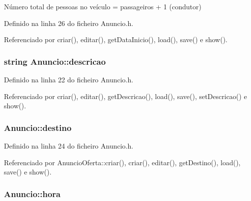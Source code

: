 Número total de pessoas no veículo = passageiros + 1 (condutor) 



Definido na linha 26 do ficheiro Anuncio.\+h.



Referenciado por criar(), editar(), get\+Data\+Inicio(), load(), save() e show().

\hypertarget{class_anuncio_aa6a9eb8d08cb06d16061b006eb2c8b97}{
\subsubsection[{descricao}]{\setlength{\rightskip}{0pt plus 5cm}string Anuncio\+::descricao\hspace{0.3cm}{\ttfamily [protected]}}}\label{class_anuncio_aa6a9eb8d08cb06d16061b006eb2c8b97}


Definido na linha 22 do ficheiro Anuncio.\+h.



Referenciado por criar(), editar(), get\+Descricao(), load(), save(), set\+Descricao() e show().

\hypertarget{class_anuncio_acdac86595f84cfb8a2bf54c414857168}{
\subsubsection[{destino}]{ Anuncio\+::destino\hspace{0.3cm}{\ttfamily [protected]}}}\label{class_anuncio_acdac86595f84cfb8a2bf54c414857168}


Definido na linha 24 do ficheiro Anuncio.\+h.



Referenciado por Anuncio\+Oferta\+::criar(), criar(), editar(), get\+Destino(), load(), save() e show().

\hypertarget{class_anuncio_aee851839cb45594b8ee550a032236cfe}{
\subsubsection[{hora}]{ Anuncio\+::hora\hspace{0.3cm}{\ttfamily [protected]}}}\label{class_anuncio_aee851839cb45594b8ee550a032236cfe}


